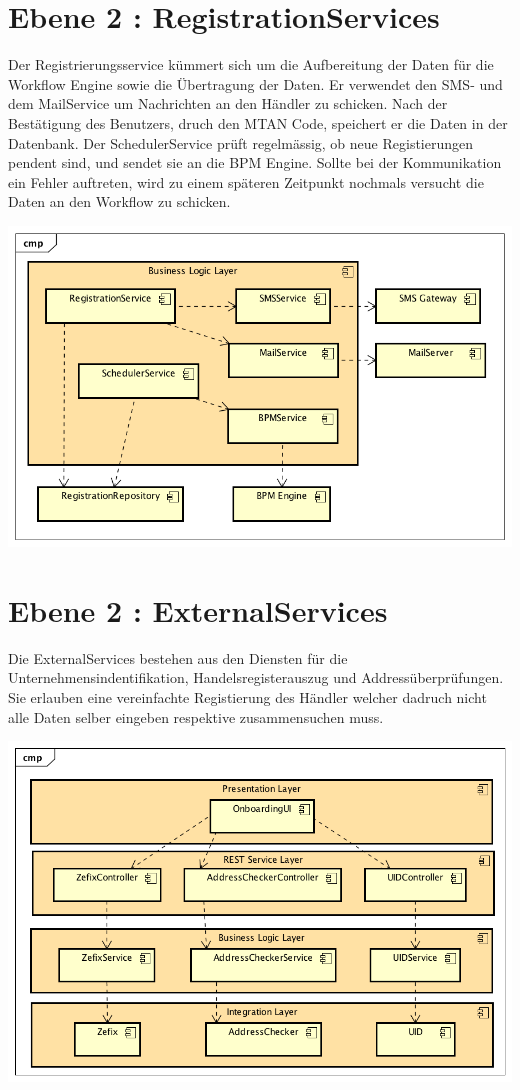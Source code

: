 \section{Ebene 2 : RegistrationServices}
\label{reg-service}

Der Registrierungsservice kümmert sich um die Aufbereitung der Daten für die Workflow Engine sowie die Übertragung der Daten. Er verwendet den SMS- und dem MailService um Nachrichten an den Händler zu schicken. Nach der Bestätigung des Benutzers, druch den MTAN Code, speichert er die Daten in der Datenbank. Der SchedulerService prüft regelmässig, ob neue Registierungen pendent sind, und sendet sie an die BPM Engine. Sollte bei der Kommunikation ein Fehler auftreten, wird zu einem späteren Zeitpunkt nochmals versucht die Daten an den Workflow zu schicken. 
\begin{center}
	\includegraphics[scale=0.65]{RegistrationServicesLevel2.png}
\end{center}
\newpage
\section{Ebene 2 : ExternalServices}

Die ExternalServices bestehen aus den Diensten für die Unternehmensindentifikation, Handelsregisterauszug und Addressüberprüfungen. Sie erlauben eine vereinfachte Registierung des Händler welcher dadruch nicht alle Daten selber eingeben respektive zusammensuchen muss.

\begin{center}
	\includegraphics[scale=0.65]{ExternalServicesLevel2.png}
\end{center}

